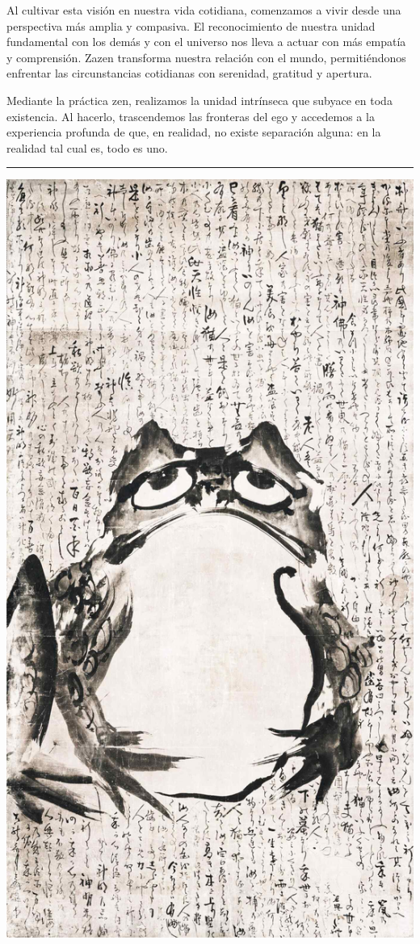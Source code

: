 \documentclass[
  a5paperpaper,
]{article}
\begin{document}
Al cultivar esta visión en nuestra vida cotidiana, comenzamos a vivir
desde una perspectiva más amplia y compasiva. El reconocimiento de
nuestra unidad fundamental con los demás y con el universo nos lleva a
actuar con más empatía y comprensión. Zazen transforma nuestra relación
con el mundo, permitiéndonos enfrentar las circunstancias cotidianas con
serenidad, gratitud y apertura.

Mediante la práctica zen, realizamos la unidad intrínseca que subyace en
toda existencia. Al hacerlo, trascendemos las fronteras del ego y
accedemos a la experiencia profunda de que, en realidad, no existe
separación alguna: en la realidad tal cual es, todo es uno.

\hfill\break

\begin{center}\rule{0.5\linewidth}{0.5pt}\end{center}

\hfill\break

\hypertarget{01}{}
\includegraphics{../img/image13.jpg}
\end{document}
